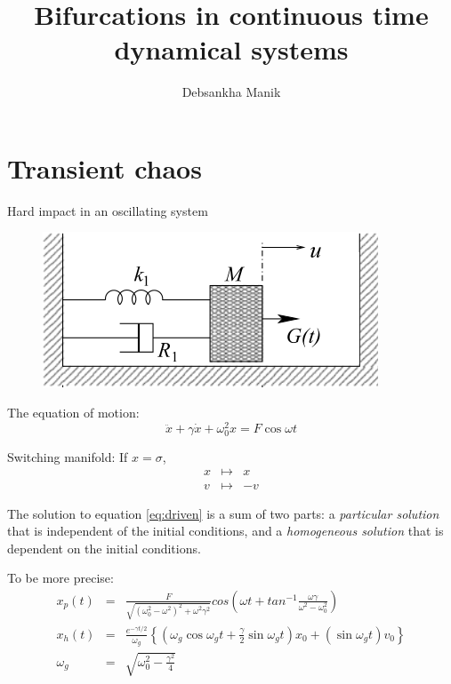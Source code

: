 \documentclass[xcolor=x11names,compress]{beamer}
\renewcommand{\(}{\begin{columns}}
\renewcommand{\)}{\end{columns}}
\newcommand{\<}[1]{\begin{column}{#1}}
\renewcommand{\>}{\end{column}}
\begin{document}
\title{Bifurcations in continuous time dynamical systems}
\author{Debsankha Manik}

\begin{frame}


\titlepage

\end{frame}
\section{Transient chaos}

\begin{frame}{Hard impact in an oscillating system}
\begin{figure}
\caption{}
\begin{center}
\includegraphics[width=0.4\columnwidth]{hardcol}
\end{center}
\end{figure}

The equation of motion:
\begin{equation}
\label{eq:driven}
\ddot{x}+\gamma\dot{x}+\omega_0^2x=F\cos{\omega t}
\end{equation}

Switching manifold:
If $x=\sigma$,
\begin{eqnarray*}
x&\mapsto& x\\
v&\mapsto& -v
\end{eqnarray*}
\end{frame}

\begin{frame}
The solution to equation \eqref{eq:driven} is a sum of two parts: a 
\emph{particular solution} that is independent of the initial conditions, and 
a \emph{homogeneous solution} that is dependent on the initial conditions.  

To be more precise:
\begin{eqnarray*}
x_p(t)&=&\frac{F}{\sqrt{(\omega_0^2-\omega^2)^2+\omega^2\gamma^2}}cos(\omega t+tan^{-1}\frac{\omega \gamma}{\omega^2-\omega_0^2})\\
x_h(t)&=&\frac{e^{-\gamma t/2}}{\omega_g}\left\{(\omega_g\cos{\omega_gt}+\frac{\gamma}{2}\sin{\omega_gt})x_0 + (\sin{\omega_gt})v_0 \right\}\\
\omega_g&=&\sqrt{\omega_0^2-\frac{\gamma^2}{4}}
\end{eqnarray*}
\end{frame}
\end{document}
